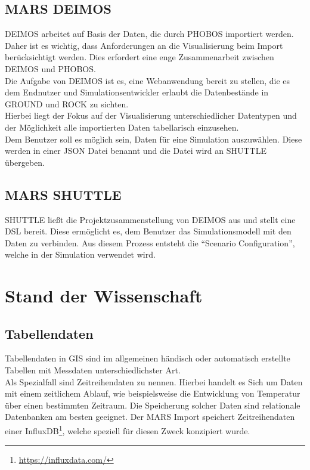 \documentclass[10pt,conference,compsocconf]{IEEEtran}
\begin{document}
\subsection{MARS DEIMOS}
\label{sub:deimos}
DEIMOS arbeitet auf Basis der Daten, die durch PHOBOS importiert werden. Daher ist es wichtig, dass Anforderungen an die Visualisierung beim Import berücksichtigt werden. Dies erfordert eine enge Zusammenarbeit zwischen DEIMOS und PHOBOS.\\
Die Aufgabe von DEIMOS ist es, eine Webanwendung bereit zu stellen, die es dem Endnutzer und Simulationsentwickler erlaubt die Datenbestände in GROUND und ROCK zu sichten.\\
Hierbei liegt der Fokus auf der Visualisierung unterschiedlicher Datentypen und der Möglichkeit alle importierten Daten tabellarisch einzusehen.\\
Dem Benutzer soll es möglich sein, Daten für eine Simulation auszuwählen. Diese werden in einer JSON Datei benannt und die Datei wird an SHUTTLE übergeben.\\


\subsection{MARS SHUTTLE}
SHUTTLE ließt die Projektzusammenstellung von DEIMOS aus und stellt eine DSL bereit. Diese ermöglicht es, dem Benutzer das Simulationsmodell mit den Daten zu verbinden. Aus diesem Prozess entsteht die \enquote{Scenario Configuration}, welche in der Simulation verwendet wird.\\



\section{Stand der Wissenschaft}


\subsection{Tabellendaten}
Tabellendaten in GIS sind im allgemeinen händisch oder automatisch erstellte Tabellen mit Messdaten unterschiedlichster Art. \\
Als Spezialfall sind Zeitreihendaten zu nennen. Hierbei handelt es Sich um Daten mit einem zeitlichem Ablauf, wie beispielsweise die Entwicklung von Temperatur über einen bestimmten Zeitraum.
Die Speicherung solcher Daten sind relationale Datenbanken am besten geeignet. Der MARS Import speichert Zeitreihendaten einer InfluxDB\footnote{\url{https://influxdata.com/}}, welche speziell für diesen Zweck konzipiert wurde.\\
\end{document}
